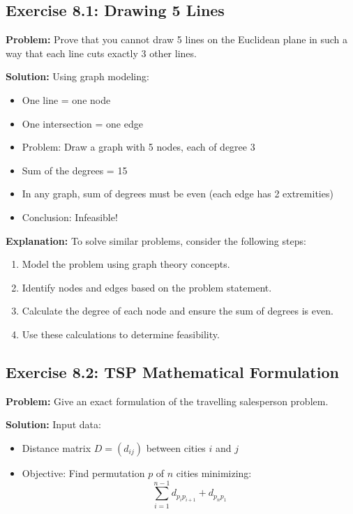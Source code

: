 \subsection{Exercise 8.1: Drawing 5 Lines}
\textbf{Problem:} Prove that you cannot draw 5 lines on the Euclidean plane in such a way that each line cuts exactly 3 other lines.

\textbf{Solution:}
Using graph modeling:
\begin{itemize}
\item One line = one node
\item One intersection = one edge
\item Problem: Draw a graph with 5 nodes, each of degree 3
\item Sum of the degrees = 15
\item In any graph, sum of degrees must be even (each edge has 2 extremities)
\item Conclusion: Infeasible!
\end{itemize}

\textbf{Explanation:}
To solve similar problems, consider the following steps:
\begin{enumerate}
\item Model the problem using graph theory concepts.
\item Identify nodes and edges based on the problem statement.
\item Calculate the degree of each node and ensure the sum of degrees is even.
\item Use these calculations to determine feasibility.
\end{enumerate}

\subsection{Exercise 8.2: TSP Mathematical Formulation}
\textbf{Problem:} Give an exact formulation of the travelling salesperson problem.

\textbf{Solution:}
Input data:
\begin{itemize}
\item Distance matrix $D = (d_{ij})$ between cities $i$ and $j$
\item Objective: Find permutation $p$ of $n$ cities minimizing:
\[ \sum_{i=1}^{n-1} d_{p_ip_{i+1}} + d_{p_np_1} \]
\end{itemize}

